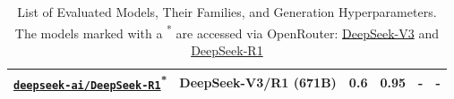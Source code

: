 \begin{table}[t]
\begin{tabular}{llcccc}
\href{https://huggingface.co/deepseek-ai/DeepSeek-R1}{\texttt{deepseek-ai/DeepSeek-R1}}\textsuperscript{*} & DeepSeek-V3/R1 (671B) & 0.6 & 0.95 & - & - \\
\bottomrule
\end{tabular}
\caption{List of Evaluated Models, Their Families, and Generation Hyperparameters. The models marked with a \textsuperscript{*} are accessed via OpenRouter: \href{https://openrouter.ai/deepseek/deepseek-chat}{DeepSeek-V3} and \href{https://openrouter.ai/deepseek/deepseek-r1}{DeepSeek-R1}}
\label{tab:hparams}
\end{table}
